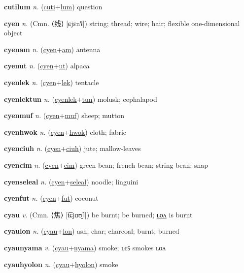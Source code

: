 \textbf{\hypertarget{cutilum}{cutilum}} \textit{n.} (\hyperlink{cuti}{cuti}+\allowbreak \hyperlink{lum}{lum})
question

\textbf{\hypertarget{cyen}{cyen}} \textit{n.} (Cmn. ⟨{\chinese{}线}⟩ [ɕjɛn˥˩])
string; thread; wire; hair; flexible one-dimensional object

\textbf{\hypertarget{cyenam}{cyenam}} \textit{n.} (\hyperlink{cyen}{cyen}+\allowbreak \hyperlink{am}{am})
antenna

\textbf{\hypertarget{cyenut}{cyenut}} \textit{n.} (\hyperlink{cyen}{cyen}+\allowbreak \hyperlink{ut}{ut})
alpaca

\textbf{\hypertarget{cyenlek}{cyenlek}} \textit{n.} (\hyperlink{cyen}{cyen}+\allowbreak \hyperlink{lek}{lek})
tentacle

\textbf{\hypertarget{cyenlektun}{cyenlektun}} \textit{n.} (\hyperlink{cyenlek}{cyenlek}+\allowbreak \hyperlink{tun}{tun})
molusk; cephalapod

\textbf{\hypertarget{cyenmuf}{cyenmuf}} \textit{n.} (\hyperlink{cyen}{cyen}+\allowbreak \hyperlink{muf}{muf})
sheep; mutton

\textbf{\hypertarget{cyenhwok}{cyenhwok}} \textit{n.} (\hyperlink{cyen}{cyen}+\allowbreak \hyperlink{hwok}{hwok})
cloth; fabric

\textbf{\hypertarget{cyenciuh}{cyenciuh}} \textit{n.} (\hyperlink{cyen}{cyen}+\allowbreak \hyperlink{ciuh}{ciuh})
jute; mallow-leaves

\textbf{\hypertarget{cyencim}{cyencim}} \textit{n.} (\hyperlink{cyen}{cyen}+\allowbreak \hyperlink{cim}{cim})
green bean; french bean; string bean; snap

\textbf{\hypertarget{cyenseleal}{cyenseleal}} \textit{n.} (\hyperlink{cyen}{cyen}+\allowbreak \hyperlink{seleal}{seleal})
noodle; linguini

\textbf{\hypertarget{cyenfut}{cyenfut}} \textit{n.} (\hyperlink{cyen}{cyen}+\allowbreak \hyperlink{fut}{fut})
coconut

\textbf{\hypertarget{cyau}{cyau}} \textit{v.} (Cmn. ⟨{\chinese{}焦}⟩ [t͡ɕjɑʊ̯˥])
be burnt; be burned; \hyperlink{cyaulon}{ʟᴏᴧ} is burnt

\textbf{\hypertarget{cyaulon}{cyaulon}} \textit{n.} (\hyperlink{cyau}{cyau}+\allowbreak \hyperlink{lon}{lon})
ash; char; charcoal; burnt; burned

\textbf{\hypertarget{cyaunyama}{cyaunyama}} \textit{v.} (\hyperlink{cyau}{cyau}+\allowbreak \hyperlink{nyama}{nyama})
smoke; ʟєꜱ smokes ʟᴏᴧ

\textbf{\hypertarget{cyauhyolon}{cyauhyolon}} \textit{n.} (\hyperlink{cyau}{cyau}+\allowbreak \hyperlink{hyolon}{hyolon})
smoke

